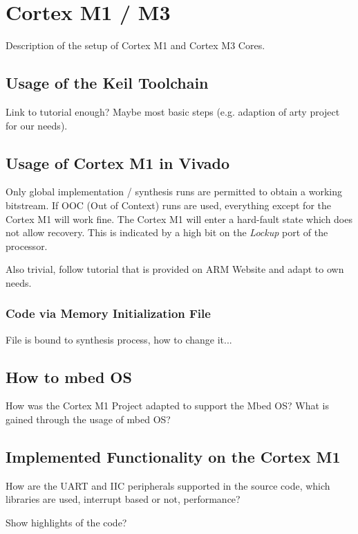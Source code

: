 \chapter{Cortex M1 / M3}

Description of the setup of Cortex M1 and Cortex M3 Cores. \cite{arm_arm_2018} \cite{arm_cortex-m1_nodate}

\section{Usage of the Keil Toolchain}

Link to tutorial enough? Maybe most basic steps (e.g. adaption of arty project for our needs). \cite{noauthor_getting_nodate}

\section{Usage of Cortex M1 in Vivado}

Only global implementation / synthesis runs are permitted to obtain a working bitstream.
If OOC (Out of Context) runs are used, everything except for the Cortex M1 will work fine. 
The Cortex M1 will enter a hard-fault state which does not allow recovery. 
This is indicated by a high bit on the \textit{Lockup} port of the processor.

Also trivial, follow tutorial that is provided on ARM Website and adapt to own needs.

\subsection{Code via Memory Initialization File}

File is bound to synthesis process, how to change it...

\section{How to mbed OS}

How was the Cortex M1 Project adapted to support the Mbed OS?
What is gained through the usage of mbed OS?

\section{Implemented Functionality on the Cortex M1}

How are the UART and IIC peripherals supported in the source code, which libraries are used, interrupt based or not, performance?

Show highlights of the code?
